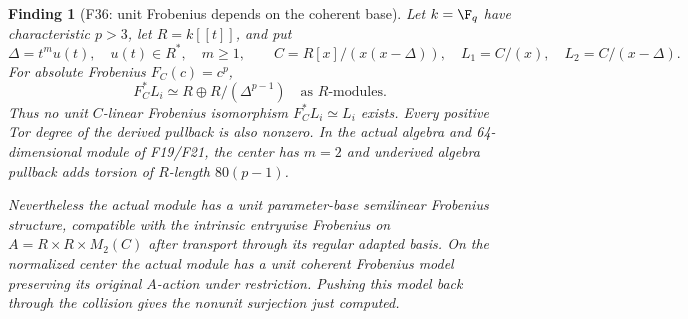 \documentclass[11pt,a4paper]{article}
\newcommand{\fid}[1]{\textsf{#1}}\newcommand{\gate}[1]{\textsf{#1}}
\theoremstyle{named}\newtheorem{finding}{Finding}[section]
\theoremstyle{definition}\newtheorem{definition}[finding]{Definition}
\theoremstyle{remark}\newtheorem{remark}[finding]{Remark}
\begin{document}
\begin{finding}[\fid{F36}: unit Frobenius depends on the coherent base]\label{f:coherentfrobenius}
Let $k=\F_q$ have characteristic $p>3$, let $R=k[[t]]$, and put
\[
 \Delta=t^m u(t),\quad u(t)\in R^*,\quad m\ge1,\qquad
 C=R[x]/(x(x-\Delta)),\quad L_1=C/(x),\quad L_2=C/(x-\Delta).
\]
For absolute Frobenius $F_C(c)=c^p$,
\[
 F_C^*L_i\simeq R\oplus R/(\Delta^{p-1})
 \quad\text{as }R\text{-modules}.
\]
Thus no unit $C$-linear Frobenius isomorphism $F_C^*L_i\simeq L_i$
exists. Every positive Tor degree of the derived pullback is also
nonzero. In the actual algebra and 64-dimensional module of
\fid{F19}/\fid{F21}, the center has $m=2$ and underived algebra
pullback adds torsion of $R$-length $80(p-1)$.

Nevertheless the actual module has a unit \emph{parameter-base}
semilinear Frobenius structure, compatible with the intrinsic
entrywise Frobenius on $A=R\times R\times M_2(C)$ after transport
through its regular adapted basis. On the normalized center the
actual module has a unit coherent Frobenius model preserving its
original $A$-action under restriction. Pushing this model back through
the collision gives the nonunit surjection just computed.
\end{finding}
\end{document}
